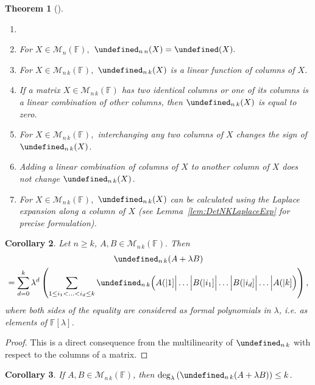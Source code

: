 \documentclass{elsarticle}
\def\F{{\mathbb F}}
\def\M{{\mathcal M}}
\let\det\undefined
\DeclareMathOperator{\det}{det}
\theoremstyle{plain}
\newtheorem{theorem}{Theorem}[section]
\newtheorem{corollary}[theorem]{Corollary}
\theoremstyle{definition}
\numberwithin{equation}{section}
\begin{document}
\begin{theorem}[{\cite[Theorem 13, Theorem 16]{NAKAGAMI2007422}}]
\begin{enumerate}
\item[]
\item For $X \in \M_{n}(\mathbb F),$ $\det_{n\,n}(X) = \det (X).$
\item For $X \in \M_{n\,k}(\mathbb F),$ $\det_{n\,k}(X)$ is a linear function of columns of $X$.
\item If a matrix $X \in \M_{n\,k}(\mathbb F)$ has two identical columns or one of its columns is a linear combination of other columns, then $\det_{n\,k}(X)$ is equal to zero.
\item For $X \in \M_{n\,k}(\mathbb F),$ interchanging any two columns of $X$ changes the sign of $\det_{n\,k}(X)$.
\item Adding a linear combination of columns of $X$ to another column of $X$ does not change $\det_{n\,k}(X)$.
\item For $X \in \M_{n\,k}(\mathbb F),$ $\det_{n\,k}(X)$ can be calculated using the Laplace expansion along a column of $X$ (see Lemma~\ref{lem:DetNKLaplaceExp} for precise formulation).
\end{enumerate}
\end{theorem}


\begin{corollary}\label{cor:CullisBinomialExpansion}Let $n \ge k$, $A, B \in \M_{n\,k} (\F).$%
Then
\begin{multline}\label{eq:CullisBinomialExpansion}
\det_{n\,k} (A + \lambda B)\\
= \sum_{d = 0}^{k}\lambda^d \left( \sum_{1 \le i_1 < \ldots < i_d \le k} \det_{n\,k}\Bigl(A(|1]\Big|\ldots \Big| B(|i_1] \Big| \ldots \Big| B(|i_d] \Big| \ldots \Big| A(|k] \Bigr)\right),
\end{multline}
where both sides of the equality are considered as formal polynomials in $\lambda$, i.e. as elements of $\F[\lambda]$.
\end{corollary}
\begin{proof}This is a direct consequence from the multilinearity of $\det_{n\,k}$ with respect to the columns of a matrix.
\end{proof}
\begin{corollary}\label{cor:DegDetABLEQK}If $A, B \in \M_{n\,k}(\F)$, then $\deg_\lambda\left(\det_{n\,k} (A + \lambda B)\right) \le k$.
\end{corollary}
\end{document}
